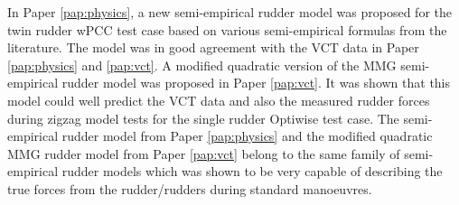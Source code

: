 In Paper \ref{pap:physics}, a new semi-empirical rudder model was proposed for the twin rudder wPCC test case based on various semi-empirical formulas from the literature. The model was in good agreement with the VCT data in Paper \ref{pap:physics} and \ref{pap:vct}. 
A modified quadratic version of the MMG semi-empirical rudder model was proposed in Paper \ref{pap:vct}. 
It was shown that this model could well predict the VCT data and also the measured rudder forces during zigzag model tests for the single rudder Optiwise test case. 
The semi-empirical rudder model from Paper \ref{pap:physics} and the modified quadratic MMG rudder model from Paper \ref{pap:vct} belong to the same family of semi-empirical rudder models which was shown to be very capable of describing the true forces from the rudder/rudders during standard manoeuvres.  